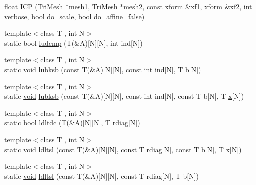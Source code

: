 \begin{DoxyCompactItemize}
\item 
float \hyperlink{namespacetrimesh_aa22c15523373c06e7a01a2243c1ab309}{I\+CP} (\hyperlink{classtrimesh_1_1TriMesh}{Tri\+Mesh} $\ast$mesh1, \hyperlink{classtrimesh_1_1TriMesh}{Tri\+Mesh} $\ast$mesh2, const \hyperlink{namespacetrimesh_ad504958f2f56e393991b848986a8459f}{xform} \&xf1, \hyperlink{namespacetrimesh_ad504958f2f56e393991b848986a8459f}{xform} \&xf2, int verbose, bool do\+\_\+scale, bool do\+\_\+affine=false)
\item 
{\footnotesize template$<$class T , int N$>$ }\\static bool \hyperlink{namespacetrimesh_afbbca679f87aba5ef182bf6be56fb4d2}{ludcmp} (T(\&A)\mbox{[}N\mbox{]}\mbox{[}N\mbox{]}, int ind\mbox{[}N\mbox{]})
\item 
{\footnotesize template$<$class T , int N$>$ }\\static \hyperlink{namespacetrimesh_a784ddfd979e1c579bda795a8edfc3f43}{void} \hyperlink{namespacetrimesh_a734b8aaf05955cb2320df40a88136886}{lubksb} (const T(\&A)\mbox{[}N\mbox{]}\mbox{[}N\mbox{]}, const int ind\mbox{[}N\mbox{]}, T b\mbox{[}N\mbox{]})
\item 
{\footnotesize template$<$class T , int N$>$ }\\static \hyperlink{namespacetrimesh_a784ddfd979e1c579bda795a8edfc3f43}{void} \hyperlink{namespacetrimesh_a8740034e0ed162cb92b761ca7c174a26}{lubksb} (const T(\&A)\mbox{[}N\mbox{]}\mbox{[}N\mbox{]}, const int ind\mbox{[}N\mbox{]}, const T b\mbox{[}N\mbox{]}, T \hyperlink{namespacetrimesh_a3365d1b1a1bc5d8e9c844cf589a8c4a8}{x}\mbox{[}N\mbox{]})
\item 
{\footnotesize template$<$class T , int N$>$ }\\static bool \hyperlink{namespacetrimesh_a747a934d5c4e2649f6254d41791ea847}{ldltdc} (T(\&A)\mbox{[}N\mbox{]}\mbox{[}N\mbox{]}, T rdiag\mbox{[}N\mbox{]})
\item 
{\footnotesize template$<$class T , int N$>$ }\\static \hyperlink{namespacetrimesh_a784ddfd979e1c579bda795a8edfc3f43}{void} \hyperlink{namespacetrimesh_abee7a794a3869cf0726a95c56db2871a}{ldltsl} (const T(\&A)\mbox{[}N\mbox{]}\mbox{[}N\mbox{]}, const T rdiag\mbox{[}N\mbox{]}, const T b\mbox{[}N\mbox{]}, T \hyperlink{namespacetrimesh_a3365d1b1a1bc5d8e9c844cf589a8c4a8}{x}\mbox{[}N\mbox{]})
\item 
{\footnotesize template$<$class T , int N$>$ }\\static \hyperlink{namespacetrimesh_a784ddfd979e1c579bda795a8edfc3f43}{void} \hyperlink{namespacetrimesh_ae5fc68fc5367dff5d2591b960ccc222f}{ldltsl} (const T(\&A)\mbox{[}N\mbox{]}\mbox{[}N\mbox{]}, const T rdiag\mbox{[}N\mbox{]}, T b\mbox{[}N\mbox{]})

\end{DoxyCompactItemize}
